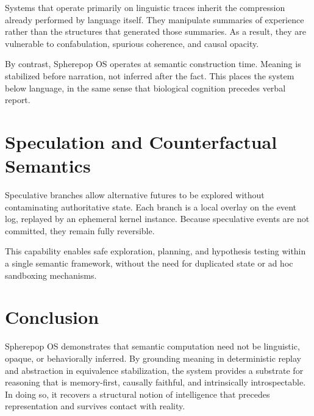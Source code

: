 Systems that operate primarily on linguistic traces inherit the compression already performed by language itself. They manipulate summaries of experience rather than the structures that generated those summaries. As a result, they are vulnerable to confabulation, spurious coherence, and causal opacity.

By contrast, Spherepop OS operates at semantic construction time. Meaning is stabilized before narration, not inferred after the fact. This places the system below language, in the same sense that biological cognition precedes verbal report.

\section{Speculation and Counterfactual Semantics}

Speculative branches allow alternative futures to be explored without contaminating authoritative state. Each branch is a local overlay on the event log, replayed by an ephemeral kernel instance. Because speculative events are not committed, they remain fully reversible.

This capability enables safe exploration, planning, and hypothesis testing within a single semantic framework, without the need for duplicated state or ad hoc sandboxing mechanisms.

\section{Conclusion}

Spherepop OS demonstrates that semantic computation need not be linguistic, opaque, or behaviorally inferred. By grounding meaning in deterministic replay and abstraction in equivalence stabilization, the system provides a substrate for reasoning that is memory-first, causally faithful, and intrinsically introspectable. In doing so, it recovers a structural notion of intelligence that precedes representation and survives contact with reality.



